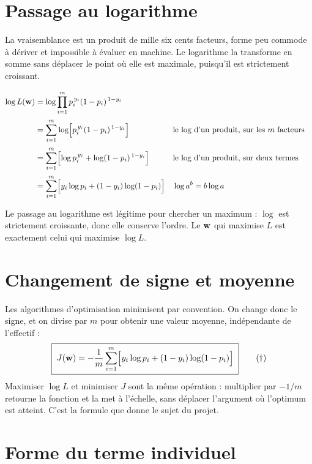 \section{Passage au logarithme}

La vraisemblance est un produit de mille six cents facteurs, forme peu commode à
dériver et impossible à évaluer en machine. Le logarithme la transforme en somme
sans déplacer le point où elle est maximale, puisqu'il est strictement croissant.

\begin{align}
  \log L(\mathbf{w})
  &= \log\prod_{i=1}^{m}p_i^{\,y_i}(1-p_i)^{\,1-y_i} \notag\\[2pt]
  &= \sum_{i=1}^{m}\log\Bigl[p_i^{\,y_i}(1-p_i)^{\,1-y_i}\Bigr]
    &&\text{le log d'un produit, sur les } m \text{ facteurs} \notag\\[2pt]
  &= \sum_{i=1}^{m}\Bigl[\log p_i^{\,y_i}+\log(1-p_i)^{\,1-y_i}\Bigr]
    &&\text{le log d'un produit, sur deux termes} \notag\\[2pt]
  &= \sum_{i=1}^{m}\Bigl[y_i\log p_i+(1-y_i)\log(1-p_i)\Bigr]
    &&\log a^{b}=b\log a \label{eq:loglik}
\end{align}

Le passage au logarithme est légitime pour chercher un maximum : $\log$ est
strictement croissante, donc elle conserve l'ordre. Le $\mathbf{w}$ qui maximise $L$ est
exactement celui qui maximise $\log L$.

\section{Changement de signe et moyenne}

Les algorithmes d'optimisation minimisent par convention. On change donc le
signe, et on divise par $m$ pour obtenir une valeur moyenne, indépendante de
l'effectif :
\begin{equation}
  \boxed{\;J(\mathbf{w})=-\frac{1}{m}\sum_{i=1}^{m}
  \Bigl[y_i\log p_i+(1-y_i)\log(1-p_i)\Bigr]\;}
  \tag{$\dagger$}\label{eq:cout}
\end{equation}
Maximiser $\log L$ et minimiser $J$ sont la même opération : multiplier par
$-1/m$ retourne la fonction et la met à l'échelle, sans déplacer l'argument où
l'optimum est atteint. C'est la formule que donne le sujet du projet.

\section{Forme du terme individuel}

